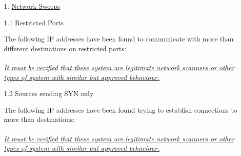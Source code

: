 \noindent
\begin{minipage}{1\textwidth}
\begin{addmargin}[10pt]{0pt}
1. \underline{Network Sweeps}
   \begin{addmargin}[15pt]{0pt}
   1.1 Restricted Ports
      \begin{addmargin}[15pt]{0pt}
      The following IP addresses have been found to communicate with more than different destinations on restricted ports:\\
      \\
      \small{\underline{\textit{It must be verified that these system are legitimate network scanners or other types of system with similar but approved behaviour.}}}\\

      \end{addmargin}
   1.2 Sources sending SYN only
      \begin{addmargin}[15pt]{0pt}
      The following IP addresses have been found trying to establish connections to more than destinations:\\
      \\
      \small{\underline{\textit{It must be verified that these system are legitimate network scanners or other types of system with similar but approved behaviour.}}}\\
      \end{addmargin}
   \end{addmargin}
\end{addmargin}
\end{minipage}

